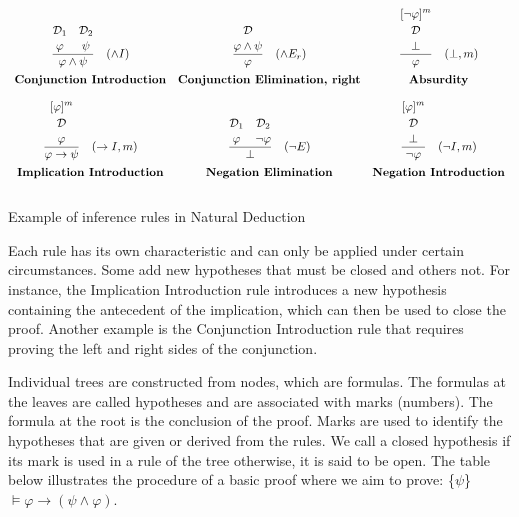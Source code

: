 \begin{table}[h]
\[
\begin{array}{c c c}
\frac{\overset{\displaystyle \mathcal{D}_1\strut}{\displaystyle \varphi\strut} \quad \overset{\displaystyle \mathcal{D}_2\strut}{\displaystyle \psi\strut}}{\displaystyle \varphi \land \psi\strut} \quad (\land I) & 
\frac{\displaystyle \overset{\displaystyle \mathcal{D}\strut}{\varphi \land \psi\strut}\strut}{\displaystyle \varphi\strut} \quad (\land E_r) & 
\frac{\overset{\displaystyle[\neg\varphi]^m\strut}{\overset{\displaystyle\mathcal{D} \strut} {\displaystyle\bot 
\strut}}}{\displaystyle \varphi\strut} \quad (\bot, m) \\[10pt]
\textbf{Conjunction Introduction} & \textbf{Conjunction Elimination, right} & \textbf{Absurdity} \\[10pt]

\frac{\overset{\displaystyle [\varphi]^m\strut}{\overset{\displaystyle \mathcal{D}\strut}{\displaystyle\varphi\strut}\strut}\strut}{\displaystyle \varphi \to \psi\strut} \quad (\to I, m) & 
\frac{\overset{\displaystyle \mathcal{D}_1\strut}{\displaystyle \varphi\strut} \quad \overset{\displaystyle \mathcal{D}_2\strut}{\displaystyle \neg \varphi\strut}}{\displaystyle \bot\strut} \quad (\neg E) & 
\frac{\overset{\displaystyle [\varphi]^m\strut}{\overset{\displaystyle \mathcal{D}\strut}{\displaystyle\bot \strut}\strut}\strut}{\displaystyle \neg \varphi\strut} \quad (\neg I, m) \\[10pt]
\textbf{Implication Introduction} & \textbf{Negation Elimination} & \textbf{Negation Introduction} \\[10pt]
\end{array}
\]

\caption{Example of inference rules in Natural Deduction}
\label{tab:inf_rules}
\end{table}
Each rule has its own characteristic and can only be applied under certain circumstances. Some add new hypotheses that must be closed and others not. For instance, the Implication Introduction rule introduces a new hypothesis containing the antecedent of the implication, which can then be used to close the proof. Another example is the Conjunction Introduction rule that requires proving the left and right sides of the conjunction.

Individual trees are constructed from nodes, which are formulas. The formulas at the leaves are called hypotheses and are associated with marks (numbers). The formula at the root is the conclusion of the proof. Marks are used to identify the hypotheses that are given or derived from the rules. We call a closed hypothesis if its mark is used in a rule of the tree otherwise, it is said to be open. The table below illustrates the procedure of a basic proof where we aim to prove: \{\(\psi\)\} \( \models \varphi \to (\psi \land \varphi) \).

